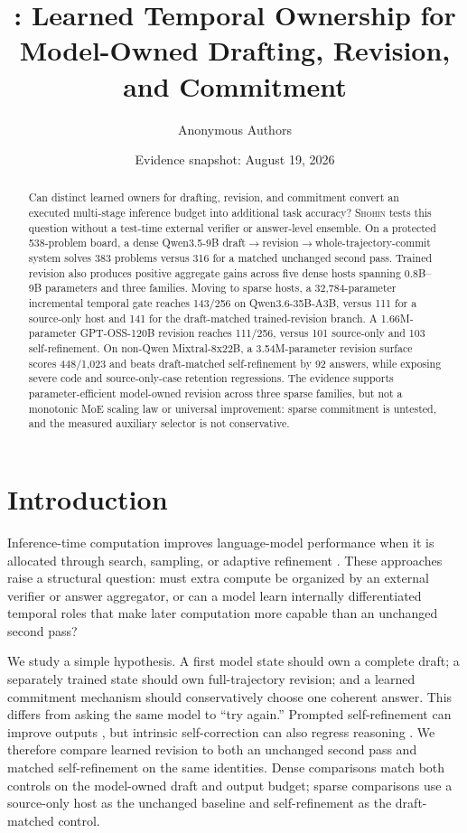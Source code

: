 \documentclass[10pt]{article}
\title{\shohin: Learned Temporal Ownership for\\
Model-Owned Drafting, Revision, and Commitment}
\author{Anonymous Authors}
\date{Evidence snapshot: August 19, 2026}
\newcommand{\shohin}{\textsc{Shohin}}
\begin{document}
\maketitle

\begin{abstract}
Can distinct learned owners for drafting, revision, and commitment convert an
executed multi-stage inference budget into additional task accuracy?
\shohin{} tests this question without a test-time external verifier or answer-level
ensemble. On a protected 538-problem board, a dense Qwen3.5-9B
draft$\rightarrow$revision$\rightarrow$whole-trajectory-commit system solves
383 problems versus 316 for a matched unchanged second pass. Trained revision
also produces positive aggregate gains across five dense hosts spanning
0.8B--9B parameters and three families. Moving to sparse hosts, a
32,784-parameter incremental temporal gate reaches 143/256 on
Qwen3.6-35B-A3B, versus 111 for a source-only host and 141 for the
draft-matched trained-revision branch. A 1.66M-parameter GPT-OSS-120B
revision reaches 111/256, versus 101 source-only and 103 self-refinement. On
non-Qwen Mixtral-8x22B, a
3.54M-parameter revision surface scores 448/1,023 and beats draft-matched
self-refinement by 92 answers, while exposing severe code and source-only-case
retention regressions. The evidence supports parameter-efficient model-owned
revision across three sparse families, but not a monotonic MoE scaling law or
universal improvement: sparse commitment is untested, and the measured
auxiliary selector is not conservative.
\end{abstract}

\section{Introduction}

Inference-time computation improves language-model performance when it is
allocated through search, sampling, or adaptive refinement
\cite{wang2022selfconsistency,snell2024testtime}. These approaches raise a
structural question: must extra compute be organized by an external verifier
or answer aggregator, or can a model learn internally differentiated temporal
roles that make later computation more capable than an unchanged second pass?

We study a simple hypothesis. A first model state should own a complete draft;
a separately trained state should own full-trajectory revision; and a learned
commitment mechanism should conservatively choose one coherent answer. This
differs from asking the same model to ``try again.'' Prompted self-refinement
can improve outputs \cite{madaan2023selfrefine}, but intrinsic self-correction
can also regress reasoning \cite{huang2024selfcorrect}. We therefore compare
learned revision to both an unchanged second pass and matched self-refinement
on the same identities. Dense comparisons match both controls on the
model-owned draft and output budget; sparse comparisons use a source-only host
as the unchanged baseline and self-refinement as the draft-matched control.
\end{document}
